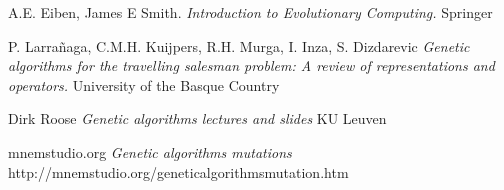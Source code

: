 \begin{thebibliography}{9}

A.E. Eiben, James E Smith.
\textit{Introduction to Evolutionary Computing.}
Springer

P. Larrañaga, C.M.H. Kuijpers, R.H. Murga, I. Inza, S. Dizdarevic
\textit{Genetic algorithms for the travelling salesman problem: A review of representations and operators.}
University of the Basque Country

Dirk Roose
\textit{Genetic algorithms lectures and slides}
KU Leuven

mnemstudio.org
\textit{Genetic algorithms mutations}
http://mnemstudio.org/genetic\-algorithms\-mutation.htm

\end{thebibliography}
